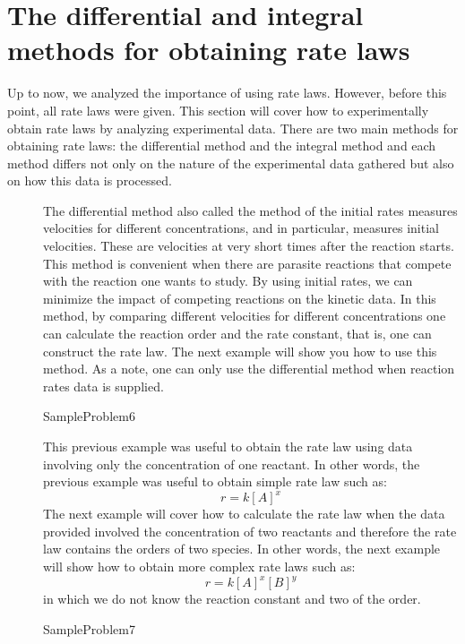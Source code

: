 \documentclass[main.tex]{subfiles}
\begin{document}
\section{The differential and integral methods for obtaining rate laws}
Up to now, we analyzed the importance of using rate laws. However, before this point, all rate laws were given. This section will cover how to experimentally obtain rate laws by analyzing experimental data. There are two main methods for obtaining rate laws: the differential method and the integral method and each method differs not only on the nature of the experimental data gathered but also on how this data is processed. 
\sloppy 
\begin{description}
\item[] 
The differential method also called the method of the initial rates measures velocities for different concentrations, and in particular, measures initial velocities. These are velocities at very short times after the reaction starts. This method is convenient when there are parasite reactions that compete with the reaction one wants to study. By using initial rates, we can minimize the impact of competing reactions on the kinetic data.
In this method, by comparing different velocities for different concentrations one can calculate the reaction order and the rate constant, that is, one can construct the rate law. The next example will show you how to use this method. As a note, one can only use the differential method when reaction rates data is supplied.

  {SampleProblem6}



This previous example was useful to obtain the rate law using data involving only the concentration of one reactant. In other words, the previous example was useful to obtain simple rate law such as:
\[r=k[A]^x\]
The next example will cover how to calculate the rate law when the data provided involved the concentration of two reactants and therefore the rate law contains the orders of two species. In other words, the next example will show how to obtain more complex rate laws such as:
\[r=k[A]^x[B]^y\]
in which we do not know the reaction constant and two of the order.


  {SampleProblem7}




\end{description}
\end{document}
